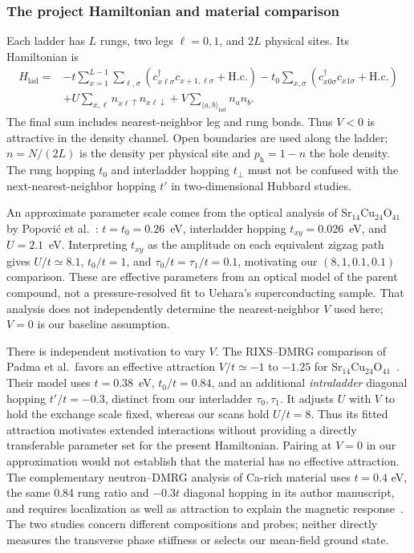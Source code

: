 \documentclass[11pt,letterpaper]{article}
\newcommand{\tp}{t_{\perp}}
\newcommand{\hc}{\mathrm{H.c.}}
\newcommand{\avg}[1]{\langle #1\rangle}
\begin{document}
\subsubsection*{The project Hamiltonian and material comparison}
Each ladder has $L$ rungs, two legs $\ell=0,1$, and $2L$ physical sites.
Its Hamiltonian is
\begin{align}
 H_{\mathrm{lad}}={}&
 -t\sum_{x=1}^{L-1}\sum_{\ell,\sigma}
  (c^\dagger_{x\ell\sigma}c_{x+1,\ell\sigma}+\hc)
 -t_0\sum_{x,\sigma}
  (c^\dagger_{x0\sigma}c_{x1\sigma}+\hc)\nonumber\\
 &+U\sum_{x,\ell}n_{x\ell\uparrow}n_{x\ell\downarrow}
 +V\sum_{\avg{a,b}_{\mathrm{lad}}}n_a n_b .
 \label{eq:model}
\end{align}
The final sum includes nearest-neighbor leg and rung bonds.
Thus $V<0$ is attractive in the density channel. Open boundaries are used
along the ladder; $n=N/(2L)$ is the density per physical site and
$p_{\mathrm h}=1-n$ the hole density. The rung hopping $t_0$ and interladder
hopping $\tp$ must not be confused with the next-nearest-neighbor hopping
$t'$ in two-dimensional Hubbard studies.

An approximate parameter scale comes from the optical analysis of
Sr$_{14}$Cu$_{24}$O$_{41}$ by Popovi\'c et al.~\citep{Popovic2000}:
$t=t_0=0.26$~eV, interladder hopping $t_{xy}=0.026$~eV, and $U=2.1$~eV.
Interpreting $t_{xy}$ as the amplitude on each equivalent zigzag path gives
$U/t\simeq8.1$, $t_0/t=1$, and $\tau_0/t=\tau_1/t=0.1$, motivating our
$(8,1,0.1,0.1)$ comparison. These are effective parameters from an optical
model of the parent compound, not a pressure-resolved fit to Uehara's
superconducting sample. That analysis does not independently determine the
nearest-neighbor $V$ used here; $V=0$ is our baseline assumption.

There is independent motivation to vary $V$. The RIXS--DMRG comparison of
Padma et al.\ favors an effective attraction $V/t\simeq-1$ to $-1.25$ for
Sr$_{14}$Cu$_{24}$O$_{41}$~\citep{Padma2025}. Their model uses
$t=0.38$~eV, $t_0/t=0.84$, and an additional \emph{intraladder} diagonal
hopping $t'/t=-0.3$, distinct from our interladder $\tau_0,\tau_1$.
It adjusts $U$ with $V$ to hold the exchange scale fixed, whereas our scans
hold $U/t=8$. Thus its fitted attraction motivates extended interactions
without providing a directly transferable parameter set for the present
Hamiltonian. Pairing at $V=0$ in our approximation would not establish that
the material has no effective attraction.
The complementary neutron--DMRG analysis of Ca-rich material uses
$t=0.4$ eV, the same 0.84 rung ratio and $-0.3t$ diagonal hopping in its
author manuscript, and requires localization as well as attraction to explain
the magnetic response~\citep{Scheie2025}. The two studies concern different
compositions and probes; neither directly measures the transverse phase
stiffness or selects our mean-field ground state.
\end{document}
